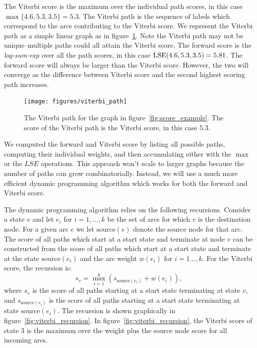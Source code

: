 The Viterbi score is the maximum over the individual path scores, in this case
$\max\{4.6, 5.3, 3.5\} = 5.3$. The Viterbi path is the sequence of labels which
correspond to the arcs contributing to the Viterbi score. We represent the
Viterbi path as a simple linear graph as in figure~\ref{fig:viterbi_path}. Note
the Viterbi path may not be unique--multiple paths could all attain the Viterbi
score. The forward score is the \emph{log-sum-exp} over all the path scores, in
this case $\operatorname*{\textrm{LSE}}(4.6, 5.3, 3.5) = 5.81$. The forward score will always be larger
than the Viterbi score. However, the two will converge as the difference
between Viterbi score and the second highest scoring path increases.

\begin{figure}
    \centering
    \texttt{[image: figures/viterbi\_path]}
    \caption{The Viterbi path for the graph in figure~\ref{fig:score_example}.
    The score of the Viterbi path is the Viterbi score, in this case $5.3$.}
    \label{fig:viterbi_path}
\end{figure}

We computed the forward and Viterbi score by listing all possible paths,
computing their individual weights, and then accumulating either with the
$\max$ or the $LSE$ operations. This approach won't scale to larger graphs
because the number of paths can grow combinatorially. Instead, we will use a
much more efficient dynamic programming algorithm which works for both the
forward and Viterbi score.

The dynamic programming algorithm relies on the following recursions. Consider a
state $v$ and let $e_i$ for $i=1, \ldots, k$ be the set of arcs for which $v$
is the destination node. For a given arc $e$ we let $\textrm{source}(e)$ denote
the source node for that arc. The score of all paths which start at a start
state and terminate at node $v$ can be constructed from the score of all paths
which start at a start state and terminate at the state $\textrm{source}(e_i)$
and the arc weight $w(e_i)$ for $i=1\ldots, k$. For the Viterbi score, the
recursion is:
$$
s_v = \max_{i=1}^k \left( s_{\textrm{source}(e_i)} + w(e_i) \right),
$$
where $s_v$ is the score of all paths starting at a start state terminating at
state $v$, and $s_{\textrm{source}(e_i)}$ is the score of all paths starting at
a start state terminating at state $\textrm{source}(e_i)$. The recursion is
shown graphically in figure~\ref{fig:viterbi_recursion}. In
figure~\ref{fig:viterbi_recursion}, the Viterbi score of state $3$ is the
maximum over the weight plus the source node score for all incoming arcs.

